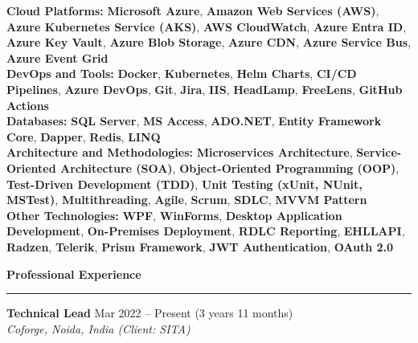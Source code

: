 \documentclass[10pt,a4paper]{article}
\newcommand{\sectionheader}[1]{%
    \vspace{8pt}
    {\large\bfseries #1}
    \vspace{2pt}
    \hrule
    \vspace{4pt}
}
\newcommand{\jobentry}[3]{%
    \vspace{4pt}
    {\normalsize\bfseries #1} \hfill #2\\
    \textit{#3}
}
\begin{document}
\textbf{Cloud Platforms:} \textbf{Microsoft Azure}, \textbf{Amazon Web Services (AWS)}, \textbf{Azure Kubernetes Service (AKS)}, \textbf{AWS CloudWatch}, \textbf{Azure Entra ID}, \textbf{Azure Key Vault}, \textbf{Azure Blob Storage}, \textbf{Azure CDN}, \textbf{Azure Service Bus}, \textbf{Azure Event Grid}\\[2pt]

\textbf{DevOps and Tools:} \textbf{Docker}, \textbf{Kubernetes}, \textbf{Helm Charts}, \textbf{CI/CD Pipelines}, \textbf{Azure DevOps}, \textbf{Git}, \textbf{Jira}, \textbf{IIS}, \textbf{HeadLamp}, \textbf{FreeLens}, \textbf{GitHub Actions}\\[2pt]

\textbf{Databases:} \textbf{SQL Server}, \textbf{MS Access}, \textbf{ADO.NET}, \textbf{Entity Framework Core}, \textbf{Dapper}, \textbf{Redis}, \textbf{LINQ}\\[2pt]

\textbf{Architecture and Methodologies:} \textbf{Microservices Architecture}, \textbf{Service-Oriented Architecture (SOA)}, \textbf{Object-Oriented Programming (OOP)}, \textbf{Test-Driven Development (TDD)}, \textbf{Unit Testing (xUnit, NUnit, MSTest)}, \textbf{Multithreading}, \textbf{Agile}, \textbf{Scrum}, \textbf{SDLC}, \textbf{MVVM Pattern}\\[2pt]

\textbf{Other Technologies:} \textbf{WPF}, \textbf{WinForms}, \textbf{Desktop Application Development}, \textbf{On-Premises Deployment}, \textbf{RDLC Reporting}, \textbf{EHLLAPI}, \textbf{Radzen}, \textbf{Telerik}, \textbf{Prism Framework}, \textbf{JWT Authentication}, \textbf{OAuth 2.0}


\sectionheader{Professional Experience}

\jobentry{Technical Lead}{Mar 2022 -- Present (3 years 11 months)}{Coforge, Noida, India (Client: SITA)}
\end{document}
